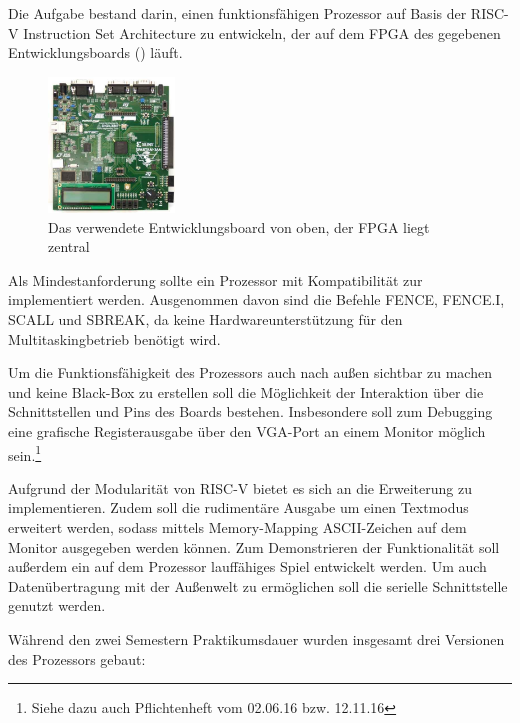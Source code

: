 

Die Aufgabe bestand darin, einen funktionsf\"ahigen Prozessor auf Basis der RISC-V Instruction Set Architecture zu entwickeln, der auf dem FPGA des gegebenen Entwicklungsboards () l\"auft.
\begin{figure}[H]
	\centering
		\includegraphics[width=0.3\textwidth]{Board.png}
	\caption{Das verwendete Entwicklungsboard von oben, der FPGA liegt zentral}
	\label{fig:board}
\end{figure}


Als Mindestanforderung sollte ein Prozessor mit Kompatibilit\"at zur  implementiert werden. Ausgenommen davon sind die Befehle FENCE, FENCE.I, SCALL und SBREAK, da keine Hardwareunterst\"utzung f\"ur den Multitaskingbetrieb ben\"otigt wird.

Um die Funktionsf\"ahigkeit des Prozessors auch nach au{\ss}en sichtbar zu machen und keine Black-Box zu erstellen soll die M\"oglichkeit der Interaktion \"uber die Schnittstellen und Pins des Boards bestehen. Insbesondere soll zum Debugging eine grafische Registerausgabe \"uber den VGA-Port an einem Monitor m\"oglich sein.\footnote{Siehe dazu auch Pflichtenheft vom 02.06.16 bzw. 12.11.16}


Aufgrund der Modularit\"at von RISC-V bietet es sich an die Erweiterung  zu implementieren. Zudem soll die rudiment\"are Ausgabe um einen Textmodus erweitert werden, sodass mittels Memory-Mapping ASCII-Zeichen auf dem Monitor ausgegeben werden k\"onnen. Zum Demonstrieren der Funktionalit\"at soll au{\ss}erdem ein auf dem Prozessor lauff\"ahiges Spiel entwickelt werden. Um auch Daten\"ubertragung mit der Au{\ss}enwelt zu erm\"oglichen soll die serielle Schnittstelle genutzt werden.

W\"ahrend den zwei Semestern Praktikumsdauer wurden insgesamt drei Versionen
des Prozessors gebaut:

